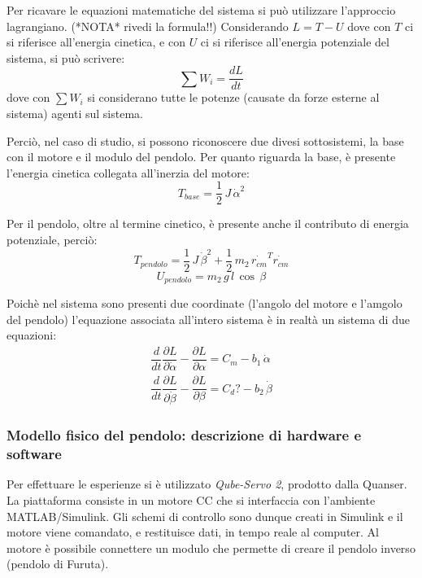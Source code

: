 \documentclass[11pt]{article}
\begin{document}
Per ricavare le equazioni matematiche del sistema si può utilizzare l'approccio lagrangiano. (*NOTA* rivedi la formula!!)
Considerando $L = T - U$ dove con $T$ ci si riferisce all'energia cinetica, e con $U$ ci si riferisce all'energia potenziale del sistema, si può scrivere:
\begin{equation}
	\sum W_i = \dfrac{dL}{dt}
\end{equation}
dove con $\sum W_i$ si considerano tutte le potenze (causate da forze esterne al sistema) agenti sul sistema.


Perciò, nel caso di studio, si possono riconoscere due divesi sottosistemi, la base con il motore e il modulo del pendolo.
Per quanto riguarda la base, è presente l'energia cinetica collegata all'inerzia del motore:
\begin{equation}
    T_{base} = \dfrac{1}{2} \, J \, \dot{\alpha}^2
\end{equation}

Per il pendolo, oltre al termine cinetico, è presente anche il contributo di energia potenziale, perciò:
\begin{equation}
    T_{pendolo} = \dfrac{1}{2} \, J \, \dot{\beta}^2 + \dfrac{1}{2} \, m_2 \, \dot{r_{cm}}^T\dot{r_{cm}}
\end{equation}
\begin{equation}
    U_{pendolo} = m_2 \, g\, l\, \cos\,\beta
\end{equation}

Poichè nel sistema sono presenti due coordinate (l'angolo \alpha del motore e l'amgolo \beta del pendolo) l'equazione associata all'intero sistema è in realtà un sistema di due equazioni:
\begin{gather}
	\dfrac{d}{dt}\dfrac{\partial L}{\partial \dot{\alpha}} - \dfrac{\partial L}{\partial \alpha} = C_m - b_1 \, \dot{\alpha} \\
	\dfrac{d}{dt}\dfrac{\partial L}{\partial \dot{\beta}} - \dfrac{\partial L}{\partial \beta} = C_d? - b_2 \, \dot{\beta}
\end{gather}




\subsubsection*{Modello fisico del pendolo: descrizione di hardware e software}
Per effettuare le esperienze si è utilizzato \textit{Qube-Servo 2}, prodotto dalla Quanser. La piattaforma consiste in un motore CC che si interfaccia con l'ambiente MATLAB/Simulink. Gli schemi di controllo sono dunque creati in Simulink e il motore viene comandato, e restituisce dati, in tempo reale al computer.
Al motore è possibile connettere un modulo che permette di creare il pendolo inverso (pendolo di Furuta).
\end{document}
